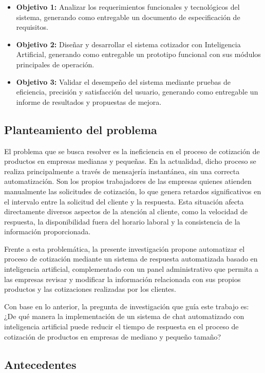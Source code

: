 \begin{itemize}
    \item \textbf{Objetivo 1:} Analizar los requerimientos funcionales y tecnológicos del sistema, generando como entregable un documento de especificación de requisitos.
    \item \textbf{Objetivo 2:} Diseñar y desarrollar el sistema cotizador con Inteligencia Artificial, generando como entregable un prototipo funcional con sus módulos principales de operación.
    \item \textbf{Objetivo 3:} Validar el desempeño del sistema mediante pruebas de eficiencia, precisión y satisfacción del usuario, generando como entregable un informe de resultados y propuestas de mejora.
\end{itemize}

\subsection{Planteamiento del problema}
\label{sec:problema}

El problema que se busca resolver es la ineficiencia en el proceso de cotización de productos en empresas medianas y pequeñas. En la actualidad, dicho proceso se realiza principalmente a través de mensajería instantánea, sin una correcta automatización. Son los propios trabajadores de las empresas quienes atienden manualmente las solicitudes de cotización, lo que genera retardos significativos en el intervalo entre la solicitud del cliente y la respuesta. Esta situación afecta directamente diversos aspectos de la atención al cliente, como la velocidad de respuesta, la disponibilidad fuera del horario laboral y la consistencia de la información proporcionada.

Frente a esta problemática, la presente investigación propone automatizar el proceso de cotización mediante un sistema de respuesta automatizada basado en inteligencia artificial, complementado con un panel administrativo que permita a las empresas revisar y modificar la información relacionada con sus propios productos y las cotizaciones realizadas por los clientes.

Con base en lo anterior, la pregunta de investigación que guía este trabajo es: ¿De qué manera la implementación de un sistema de chat automatizado con inteligencia artificial puede reducir el tiempo de respuesta en el proceso de cotización de productos en empresas de mediano y pequeño tamaño?

\subsection{Antecedentes}
\label{sec:antecedentes}

